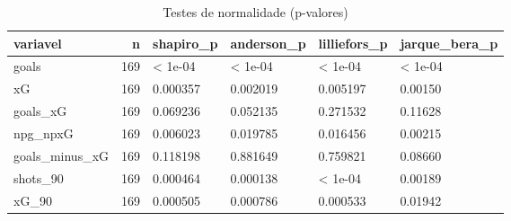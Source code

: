 \begin{table}

\caption{\label{tab:normalidade_g20}Testes de normalidade (p-valores)}
\centering
\begin{tabular}[t]{lrllll}
\toprule
variavel & n & shapiro\_p & anderson\_p & lilliefors\_p & jarque\_bera\_p\\
\midrule
goals & 169 & < 1e-04 & < 1e-04 & < 1e-04 & < 1e-04\\
xG & 169 & 0.000357 & 0.002019 & 0.005197 & 0.00150\\
goals\_xG & 169 & 0.069236 & 0.052135 & 0.271532 & 0.11628\\
npg\_npxG & 169 & 0.006023 & 0.019785 & 0.016456 & 0.00215\\
goals\_minus\_xG & 169 & 0.118198 & 0.881649 & 0.759821 & 0.08660\\
\addlinespace
shots\_90 & 169 & 0.000464 & 0.000138 & < 1e-04 & 0.00189\\
xG\_90 & 169 & 0.000505 & 0.000786 & 0.000533 & 0.01942\\
\bottomrule
\end{tabular}
\end{table}
